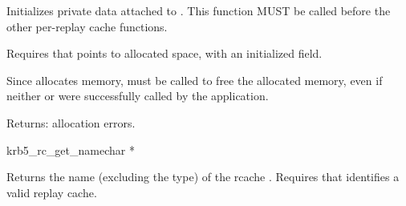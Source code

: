 Initializes private data attached to .  This function MUST
be called before the other per-replay cache functions.

Requires that  points to allocated space, with an
initialized  field.

Since  allocates memory,
 must be called to free the allocated memory,
even if neither  or
 were successfully called by the application.

Returns:  allocation errors.


\begin{funcdecl}{krb5_rc_get_name}{char *}{\funcin}
\end{funcdecl}

Returns the name (excluding the type) of the rcache .
Requires that  identifies a valid replay cache.


